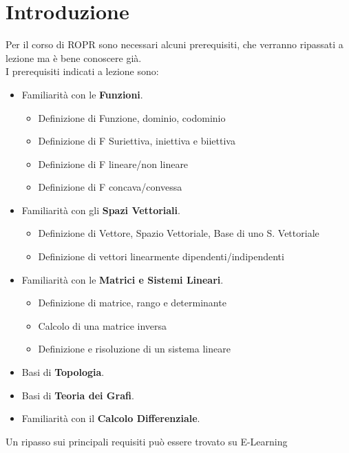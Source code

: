 \documentclass[12pt, a4paper, openany]{book}
\begin{document}
\section{Introduzione}
Per il corso di ROPR sono necessari alcuni prerequisiti, che verranno ripassati a lezione ma è bene conoscere già.
\\I prerequisiti indicati a lezione sono:
\begin{itemize}
    \item Familiarità con le \textbf{Funzioni}.
    \begin{itemize}
        \item Definizione di Funzione, dominio, codominio
        \item Definizione di F Suriettiva, iniettiva e biiettiva
        \item Definizione di F lineare/non lineare
        \item Definizione di F concava/convessa
    \end{itemize}
    \item Familiarità con gli \textbf{Spazi Vettoriali}.
    \begin{itemize}
        \item Definizione di Vettore, Spazio Vettoriale, Base di uno S. Vettoriale
        \item Definizione di vettori linearmente dipendenti/indipendenti
    \end{itemize}
    \item Familiarità con le \textbf{Matrici e Sistemi Lineari}.
    \begin{itemize}
        \item Definizione di matrice, rango e determinante
        \item Calcolo di una matrice inversa
        \item Definizione e risoluzione di un sistema lineare
    \end{itemize}
    \item Basi di \textbf{Topologia}.
    \item Basi di \textbf{Teoria dei Grafi}.
    \item Familiarità con il \textbf{Calcolo Differenziale}.
\end{itemize}
Un ripasso sui principali requisiti può essere trovato su E-Learning
\end{document}
